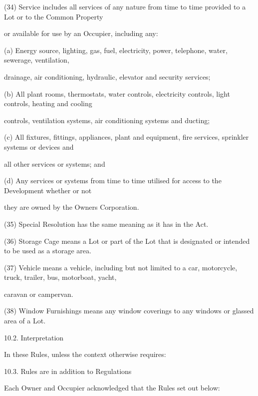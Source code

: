 \documentclass{article}
\begin{document}
{\fontsize{9.962}{1}(34) Service includes all services of any nature from time to time provided to a Lot or to the Common Property }

{\fontsize{10.02}{1}or available for use by an Occupier, including any: }

{\fontsize{9.962}{1}(a) Energy source, lighting, gas, fuel, electricity, power, telephone, water, sewerage, ventilation, }

{\fontsize{10.02}{1}drainage, air conditioning, hydraulic, elevator and security services; }

{\fontsize{9.962}{1}(b) All plant rooms, thermostats, water controls, electricity controls, light controls, heating and cooling }

{\fontsize{10.02}{1}controls, ventilation systems, air conditioning systems and ducting; }

{\fontsize{9.962}{1}(c) All fixtures, fittings, appliances, plant and equipment, fire services, sprinkler systems or devices and }

{\fontsize{10.02}{1}all other services or systems; and }

{\fontsize{9.962}{1}(d) Any services or systems from time to time utilised for access to the Development whether or not }

{\fontsize{10.02}{1}they are owned by the Owners Corporation. }

{\fontsize{9.962}{1}(35) Special Resolution has the same meaning as it has in the Act. }

{\fontsize{9.962}{1}(36) Storage Cage means a Lot or part of the Lot that is designated or intended to be used as a storage area. }

{\fontsize{9.962}{1}(37) Vehicle means a vehicle, including but not limited to a car, motorcycle, truck, trailer, bus, motorboat, yacht, }

{\fontsize{10.02}{1}caravan or campervan. }

{\fontsize{9.962}{1}(38) Window Furnishings means any window coverings to any windows or glassed area of a Lot. }

{\fontsize{9.99}{1}10.2. Interpretation }

{\fontsize{10.02}{1}In these Rules, unless the context otherwise requires: }

{\fontsize{9.99}{1}10.3. Rules are in addition to Regulations }

{\fontsize{10.02}{1}Each Owner and Occupier acknowledged that the Rules set out below: }

\newpage
\end{document}
